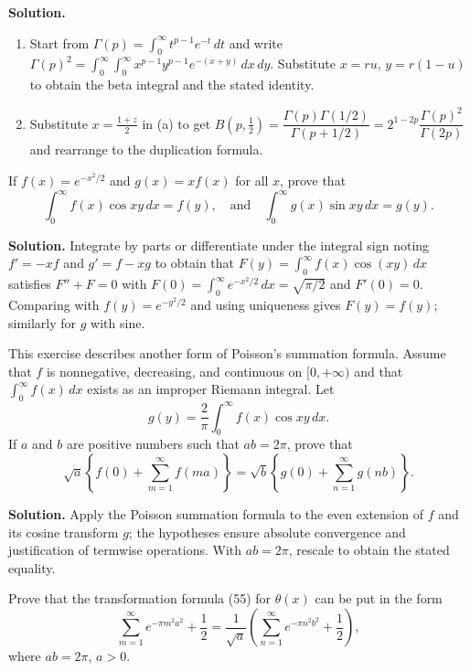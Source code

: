 \noindent\textbf{Solution.}
\begin{enumerate}[label=(\alph*)]
\item Start from $\Gamma(p)=\int_0^{\infty} t^{p-1}e^{-t}\,dt$ and write $\Gamma(p)^2=\int_0^{\infty}\int_0^{\infty} x^{p-1}y^{p-1}e^{-(x+y)}\,dx\,dy$. Substitute $x=ru$, $y=r(1-u)$ to obtain the beta integral and the stated identity.
\item Substitute $x=\tfrac{1+z}{2}$ in (a) to get $B(p,\tfrac12)=\dfrac{\Gamma(p)\Gamma(1/2)}{\Gamma(p+1/2)}=2^{1-2p}\dfrac{\Gamma(p)^2}{\Gamma(2p)}$ and rearrange to the duplication formula.
\end{enumerate}

\begin{problembox}
If $f(x) = e^{-x^2/2}$ and $g(x) = x f(x)$ for all $x$, prove that
\[
\int_0^\infty f(x) \cos xy \, dx = f(y), \quad \text{and} \quad \int_0^\infty g(x) \sin xy \, dx = g(y).
\]
\end{problembox}

\noindent\textbf{Solution.}
Integrate by parts or differentiate under the integral sign noting $f'= -x f$ and $g'= f- x g$ to obtain that $F(y)=\int_0^{\infty} f(x)\cos(xy)\,dx$ satisfies $F''+F=0$ with $F(0)=\int_0^{\infty} e^{-x^2/2}\,dx=\sqrt{\pi/2}$ and $F'(0)=0$. Comparing with $f(y)=e^{-y^2/2}$ and using uniqueness gives $F(y)=f(y)$; similarly for $g$ with sine.

\begin{problembox}
This exercise describes another form of Poisson's summation formula. Assume that $f$ is nonnegative, decreasing, and continuous on $[0, +\infty)$ and that $\int_0^\infty f(x) \, dx$ exists as an improper Riemann integral. Let
\[
g(y) = \frac{2}{\pi} \int_0^\infty f(x) \cos xy \, dx.
\]
If $a$ and $b$ are positive numbers such that $ab = 2\pi$, prove that
\[
\sqrt{a} \left\{ f(0) + \sum_{m=1}^\infty f(ma) \right\} = \sqrt{b} \left\{ g(0) + \sum_{n=1}^\infty g(nb) \right\}.
\]
\end{problembox}

\noindent\textbf{Solution.}
Apply the Poisson summation formula to the even extension of $f$ and its cosine transform $g$; the hypotheses ensure absolute convergence and justification of termwise operations. With $ab=2\pi$, rescale to obtain the stated equality.

\begin{problembox}
Prove that the transformation formula (55) for $\theta(x)$ can be put in the form
\[
\sum_{m=1}^\infty e^{-\pi m^2 a^2} + \frac{1}{2} = \frac{1}{\sqrt{a}} \left( \sum_{n=1}^\infty e^{-\pi n^2 b^2} + \frac{1}{2} \right),
\]
where $ab = 2\pi$, $a > 0$.
\end{problembox}

